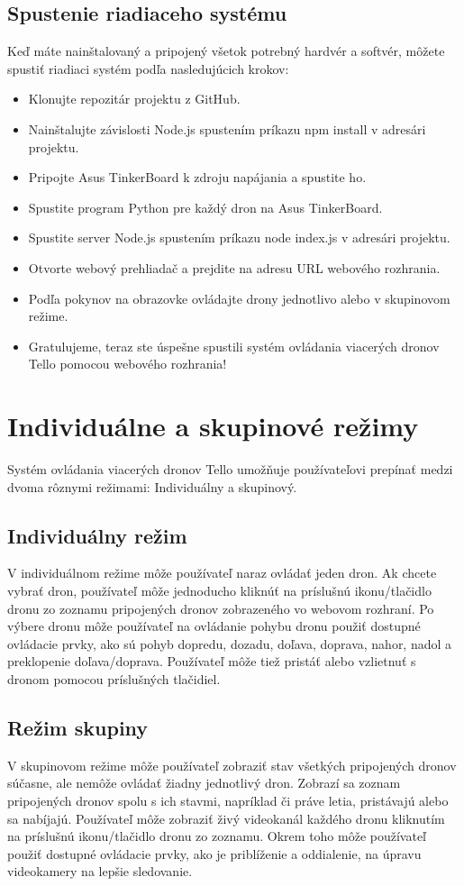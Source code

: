 \documentclass[a4paper]{feidippp}
\begin{document}
\subsection{Spustenie riadiaceho systému}
Keď máte nainštalovaný a pripojený všetok potrebný hardvér a softvér, môžete spustiť riadiaci systém podľa nasledujúcich krokov:

\begin{itemize}
  \item Klonujte repozitár projektu z GitHub.
  \item Nainštalujte závislosti Node.js spustením príkazu npm install v adresári projektu.
  \item Pripojte Asus TinkerBoard k zdroju napájania a spustite ho.
  \item Spustite program Python pre každý dron na Asus TinkerBoard.
  \item Spustite server Node.js spustením príkazu node index.js v adresári projektu.
  \item Otvorte webový prehliadač a prejdite na adresu URL webového rozhrania.
  \item Podľa pokynov na obrazovke ovládajte drony jednotlivo alebo v skupinovom režime.
  \item Gratulujeme, teraz ste úspešne spustili systém ovládania viacerých dronov Tello pomocou webového rozhrania!
\end{itemize}

\newpage
\section{Individuálne a skupinové režimy}
Systém ovládania viacerých dronov Tello umožňuje používateľovi prepínať medzi dvoma rôznymi režimami: Individuálny a skupinový.

\subsection{Individuálny režim}
V individuálnom režime môže používateľ naraz ovládať jeden dron. Ak chcete vybrať dron, používateľ môže jednoducho kliknúť na príslušnú ikonu/tlačidlo dronu zo zoznamu pripojených dronov zobrazeného vo webovom rozhraní. Po výbere dronu môže používateľ na ovládanie pohybu dronu použiť dostupné ovládacie prvky, ako sú pohyb dopredu, dozadu, doľava, doprava, nahor, nadol a preklopenie doľava/doprava. Používateľ môže tiež pristáť alebo vzlietnuť s dronom pomocou príslušných tlačidiel.

\subsection{Režim skupiny}
V skupinovom režime môže používateľ zobraziť stav všetkých pripojených dronov súčasne, ale nemôže ovládať žiadny jednotlivý dron. Zobrazí sa zoznam pripojených dronov spolu s ich stavmi, napríklad či práve letia, pristávajú alebo sa nabíjajú. Používateľ môže zobraziť živý videokanál každého dronu kliknutím na príslušnú ikonu/tlačidlo dronu zo zoznamu. Okrem toho môže používateľ použiť dostupné ovládacie prvky, ako je priblíženie a oddialenie, na úpravu videokamery na lepšie sledovanie.
\end{document}
